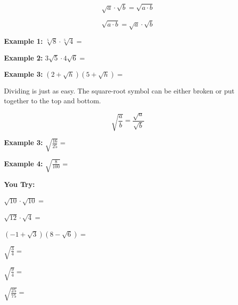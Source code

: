 \documentclass[12pt]{article}
\begin{document}
$$\sqrt{a} \cdot \sqrt{b} = \sqrt{a \cdot b}$$

$$\sqrt{a \cdot b}= \sqrt{a}\cdot \sqrt{b}$$

\textbf{Example 1:} $\sqrt[5]{8} \cdot \sqrt[5]{4}=$\\

\vspace{1cm}

\textbf{Example 2:} $3\sqrt{5} \cdot 4 \sqrt{6}=$\\

\vspace{1cm}

\textbf{Example 3:} $(2+\sqrt{h})(5+\sqrt{h})=$\\

\vspace{.7cm}

\hrulefill

Dividing is just as easy. The square-root symbol can be either broken or put together to the top and bottom.
	
$$\sqrt{\frac{a}{b}}= \frac{\sqrt{a}}{\sqrt{b}}$$

\textbf{Example 3:} $\sqrt{\frac{16}{25}}=$

\vspace{1cm}

\textbf{Example 4:} $\sqrt{\frac{8}{100}}=$

\vspace{.7cm}


\hrulefill

\textbf{You Try:}
\begin{enumerate}
\begin{multicols}{2}
\setlength\itemsep{1cm}

	\item $\sqrt{10} \cdot \sqrt{10}=$\\
	
	\item $\sqrt{12} \cdot \sqrt{4}=$\\
	
	\item $(-1 + \sqrt{3})(8 - \sqrt{6})=$\\
	
	\item $\sqrt{\frac{3}{4}}=$\\
	
	\item $\sqrt{\frac{9}{4}}=$\\
	
	\item $\sqrt{\frac{25}{75}}=$
\end{multicols}
\end{enumerate} 
\end{document}
